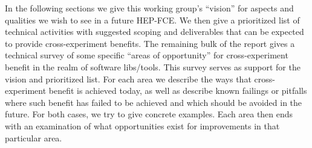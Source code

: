 In the following sections we give this working group's ``vision'' for
aspects and qualities we wish to see in a future HEP-FCE.  We then
give a prioritized list of technical activities with suggested scoping
and deliverables that can be expected to provide cross-experiment
benefits.  The remaining bulk of the report gives a technical survey of some
specific ``areas of opportunity'' for cross-experiment benefit in the
realm of software libs/tools.  This survey serves as support for the
vision and prioritized list.  For each area we describe the ways that
cross-experiment benefit is achieved today, as well as describe known
failings or pitfalls where such benefit has failed to be achieved and
which should be avoided in the future.  For both cases, we try to give
concrete examples.  Each area then ends with an examination of what
opportunities exist for improvements in that particular area.


